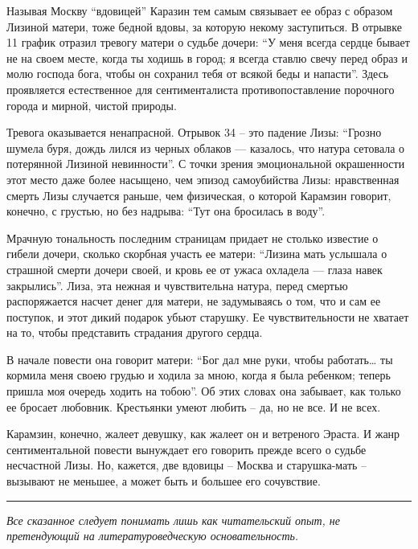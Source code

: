 \documentclass[
]{article}
\begin{document}
Называя Москву ``вдовицей'' Каразин тем самым связывает ее образ с
образом Лизиной матери, тоже бедной вдовы, за которую некому
заступиться. В отрывке 11 график отразил тревогу матери о судьбе дочери:
``У меня всегда сердце бывает не на своем месте, когда ты ходишь в
город; я всегда ставлю свечу перед образ и молю господа бога, чтобы он
сохранил тебя от всякой беды и напасти''. Здесь проявляется естественное
для сентименталиста противопоставление порочного города и мирной, чистой
природы.

Тревога оказывается ненапрасной. Отрывок 34 -- это падение Лизы:
``Грозно шумела буря, дождь лился из черных облаков --- казалось, что
натура сетовала о потерянной Лизиной невинности''. С точки зрения
эмоциональной окрашенности этот место даже более насыщено, чем эпизод
самоубийства Лизы: нравственная смерть Лизы случается раньше, чем
физическая, о которой Карамзин говорит, конечно, с грустью, но без
надрыва: ``Тут она бросилась в воду''.

Мрачную тональность последним страницам придает не столько известие о
гибели дочери, сколько скорбная участь ее матери: ``Лизина мать услышала
о страшной смерти дочери своей, и кровь ее от ужаса охладела --- глаза
навек закрылись''. Лиза, эта нежная и чувствительна натура, перед
смертью распоряжается насчет денег для матери, не задумываясь о том, что
и сам ее поступок, и этот дикий подарок убьют старушку. Ее
чувствительности не хватает на то, чтобы представить страдания другого
сердца.

В начале повести она говорит матери: ``Бог дал мне руки, чтобы
работать\ldots{} ты кормила меня своею грудью и ходила за мною, когда я
была ребенком; теперь пришла моя очередь ходить на тобою''. Об этих
словах она забывает, как только ее бросает любовник. Крестьянки умеют
любить -- да, но не все. И не всех.

Карамзин, конечно, жалеет девушку, как жалеет он и ветреного Эраста. И
жанр сентиментальной повести вынуждает его говорить прежде всего о
судьбе несчастной Лизы. Но, кажется, две вдовицы -- Москва и
старушка-мать -- вызывают не меньшее, а может быть и большее его
сочувствие.

\begin{center}\rule{0.5\linewidth}{0.5pt}\end{center}

\emph{Все сказанное следует понимать лишь как читательский опыт, не
претендующий на литературоведческую основательность.}
\end{document}
